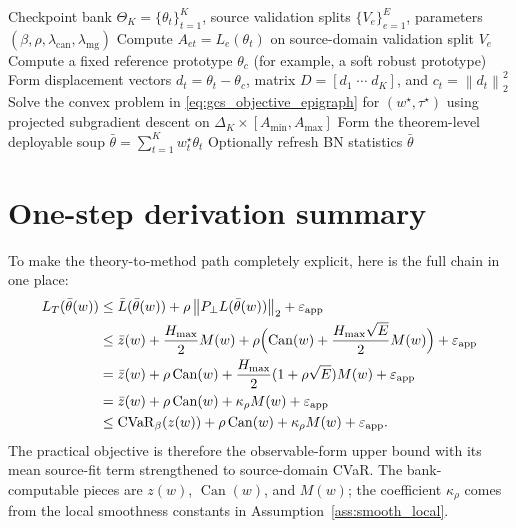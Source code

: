 \documentclass[11pt]{article}
\newcommand{\1}{\mathbf{1}}
\newcommand{\cvar}{\operatorname{CVaR}}
\newcommand{\norm}[1]{\left\lVert #1 \right\rVert}
\newcommand{\Dset}{\Delta_K}
\newcommand{\Pperp}{P_\perp}
\theoremstyle{plain}
\theoremstyle{definition}
\theoremstyle{remark}
\begin{document}
\begin{algorithm}[t]
\caption{Global Canalized Souping (GCS)}
\begin{algorithmic}[1]
\Require Checkpoint bank $\Theta_K = \{\theta_t\}_{t=1}^K$, source validation splits $\{V_e\}_{e=1}^E$, parameters $(\beta,\rho,\lambda_{\mathrm{can}},\lambda_{\mathrm{mg}})$
        \State Compute $A_{et} = L_e(\theta_t)$ on source-domain validation split $V_e$
    \EndFor
\EndFor
\State Compute a fixed reference prototype $\theta_c$ (for example, a soft robust prototype)
\State Form displacement vectors $d_t = \theta_t - \theta_c$, matrix $D = [d_1\;\cdots\;d_K]$, and $c_t = \norm{d_t}_2^2$
\State Solve the convex problem in \eqref{eq:gcs_objective_epigraph} for $(w^\star,\tau^\star)$ using projected subgradient descent on $\Dset \times [A_{\min},A_{\max}]$
\State Form the theorem-level deployable soup $\bar\theta = \sum_{t=1}^K w_t^\star \theta_t$
\State Optionally refresh BN statistics 
\State \Return $\bar\theta$
\end{algorithmic}
\end{algorithm}

\section{One-step derivation summary}
To make the theory-to-method path completely explicit, here is the full chain in one place:
\begin{align*}
L_T(\bar\theta(w))
&\le \bar L(\bar\theta(w)) + \rho\norm{\Pperp L(\bar\theta(w))}_2 + \varepsilon_{\mathrm{app}} \\
&\le \bar z(w) + \frac{H_{\max}}{2}M(w) + \rho\Bigl(\operatorname{Can}(w) + \frac{H_{\max}\sqrt{E}}{2}M(w)\Bigr) + \varepsilon_{\mathrm{app}} \\
&= \bar z(w) + \rho\operatorname{Can}(w) + \frac{H_{\max}}{2}(1 + \rho\sqrt{E})M(w) + \varepsilon_{\mathrm{app}} \\
&= \bar z(w) + \rho\operatorname{Can}(w) + \kappa_{\rho}M(w) + \varepsilon_{\mathrm{app}} \\
&\le \cvar_{\beta}(z(w)) + \rho\operatorname{Can}(w) + \kappa_{\rho}M(w) + \varepsilon_{\mathrm{app}}.
\end{align*}
The practical objective is therefore the observable-form upper bound with its mean source-fit term strengthened to source-domain CVaR. The bank-computable pieces are $z(w)$, $\operatorname{Can}(w)$, and $M(w)$; the coefficient $\kappa_{\rho}$ comes from the local smoothness constants in Assumption~\ref{ass:smooth_local}.
\end{document}
